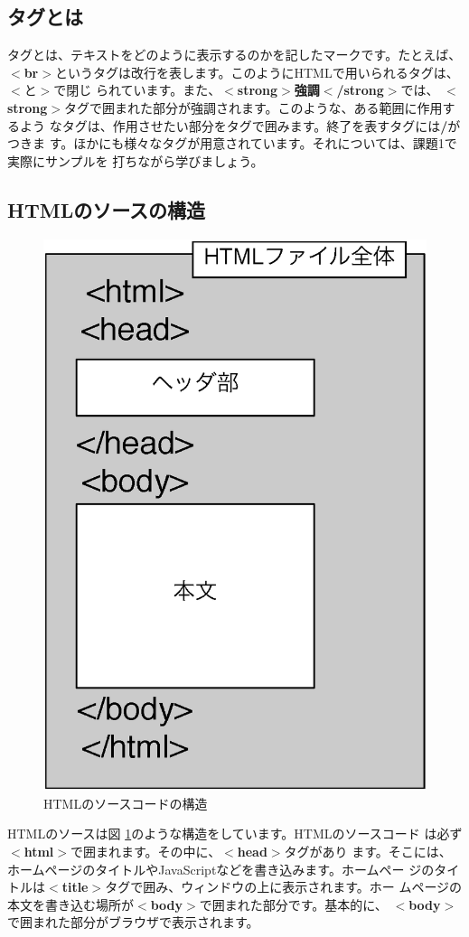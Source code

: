 \documentclass[12pt, a4j]{jsarticle}
\newcommand{\figref}[1]{図 \ref{#1}}
\begin{document}
\subsection{タグとは}

タグとは、テキストをどのように表示するのかを記したマークです。たとえば、{\bf \sf
$<$br$>$}というタグは改行を表します。このようにHTMLで用いられるタグは、$<$と$>$で閉じ
られています。また、{\bf \sf $<$strong$>$強調$<$/strong$>$}では、{\bf \sf
$<$strong$>$}タグで囲まれた部分が強調されます。このような、ある範囲に作用するよう
なタグは、作用させたい部分をタグで囲みます。終了を表すタグには{\bf \sf /}がつきま
す。ほかにも様々なタグが用意されています。それについては、課題1で実際にサンプルを
打ちながら学びましょう。

\subsection{HTMLのソースの構造}

\begin{figure}
\vspace{-35pt}
\begin{center}
\includegraphics[width=0.6\linewidth]{structure.eps}
\caption{HTMLのソースコードの構造}
\label{fig:structure}
\end{center}
\end{figure}
HTMLのソースは\figref{fig:structure}のような構造をしています。HTMLのソースコード
は必ず{\bf \sf $<$html$>$}で囲まれます。その中に、{\bf \sf $<$head$>$}タグがあり
ます。そこには、ホームページのタイトルやJavaScriptなどを書き込みます。ホームペー
ジのタイトルは{\bf \sf $<$title$>$}タグで囲み、ウィンドウの上に表示されます。ホー
ムページの本文を書き込む場所が{\bf \sf $<$body$>$}で囲まれた部分です。基本的に、
{\bf \sf $<$body$>$}で囲まれた部分がブラウザで表示されます。
\end{document}
